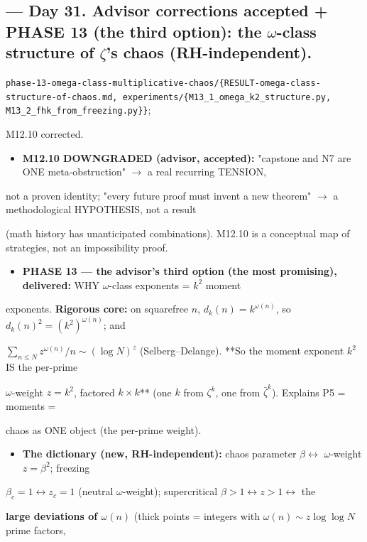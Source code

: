 \documentclass[10pt]{article}
\begin{document}
\subsection*{ --- Day 31. Advisor corrections accepted + PHASE 13 (the third option): the \ensuremath{\omega}-class structure of \ensuremath{\zeta}'s chaos (RH-independent).}
\texttt{phase-13-omega-class-multiplicative-chaos/\{RESULT-omega-class-structure-of-chaos.md, experiments/\{M13\_1\_omega\_k2\_structure.py, M13\_2\_fhk\_from\_freezing.py\}\}};\par
M12.10 corrected.\par
\begin{itemize}
\item \textbf{M12.10 DOWNGRADED (advisor, accepted):} "capstone and N7 are ONE meta-obstruction" \ensuremath{\to} a real recurring TENSION,
\end{itemize}
  not a proven identity; "every future proof must invent a new theorem" \ensuremath{\to} a methodological HYPOTHESIS, not a result\par
  (math history has unanticipated combinations). M12.10 is a conceptual map of strategies, not an impossibility proof.\par
\begin{itemize}
\item \textbf{PHASE 13 --- the advisor's third option (the most promising), delivered:} WHY \ensuremath{\omega}-class exponents = $k^2$ moment
\end{itemize}
  exponents. \textbf{Rigorous core:} on squarefree $n$, $d_k(n)=k^{\omega(n)}$, so $d_k(n)^2=(k^2)^{\omega(n)}$; and\par
  $\sum_{n\le N}z^{\omega(n)}/n\sim(\log N)^z$ (Selberg--Delange). **So the moment exponent $k^2$ IS the per-prime\par
  \ensuremath{\omega}-weight $z=k^2$, factored $k\times k$** (one $k$ from $\zeta^k$, one from $\bar\zeta^k$). Explains P5 = moments =\par
  chaos as ONE object (the per-prime weight).\par
\begin{itemize}
\item \textbf{The dictionary (new, RH-independent):} chaos parameter $\beta\leftrightarrow$ \ensuremath{\omega}-weight $z=\beta^2$; freezing
\end{itemize}
  $\beta_c=1\leftrightarrow z_c=1$ (neutral \ensuremath{\omega}-weight); supercritical $\beta>1\leftrightarrow z>1\leftrightarrow$ the\par
  \textbf{large deviations of $\omega(n)$} (thick points = integers with $\omega(n)\sim z\log\log N$ prime factors,\par
\end{document}
